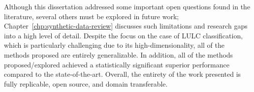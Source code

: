 Although this dissertation addressed some important open questions found in
the literature, several others must be explored in future work;
Chapter~\ref{chp:synthetic-data-review} discusses such limitations and
research gaps into a high level of detail. Despite the focus on the case of
LULC classification, which is particularly challenging due to its
high-dimensionality, all of the methods proposed are entirely generalizable.
In addition, all of the methods proposed/explored achieved a statistically
significant superior performance compared to the state-of-the-art. Overall,
the entirety of the work presented is fully replicable, open source, and
domain transferable. 
